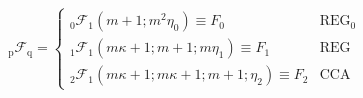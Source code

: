 \documentclass[twoside]{article}
\begin{document}
\begin{itemize}
\begin{itemize}
        \begin{equation}
            _{\mathrm{p}}\mathcal{F}_{\mathrm{q}} = \begin{cases}
                _{\mathrm{0}}\mathcal{F}_{\mathrm{1}} (m+1;m^2\eta_0) \equiv F_0 & \text{REG}_0 \\
                _{\mathrm{1}}\mathcal{F}_{\mathrm{1}} (m\kappa + 1; m+1; m\eta_1) \equiv F_1 & \text{REG} \\
                _{\mathrm{2}}\mathcal{F}_{\mathrm{1}} (m\kappa +1; m\kappa+1;m+1;\eta_2) \equiv F_2 & \text{CCA}
            \end{cases}
        \end{equation}
    \end{itemize}
\end{itemize}

\newpage


\end{document}

